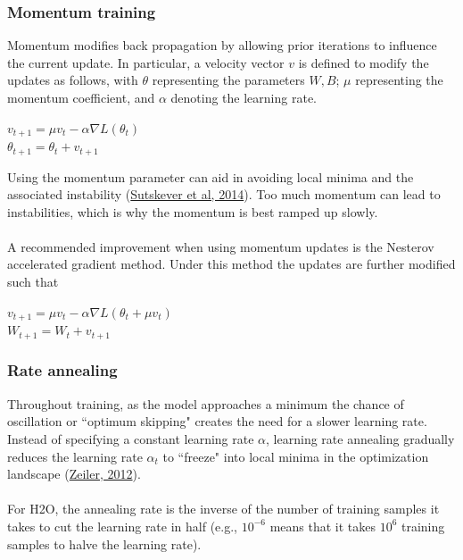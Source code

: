 \documentclass[11pt]{article}
\begin{document}
\subsubsection{Momentum training} \label{2.4.1}
Momentum modifies back propagation by allowing prior iterations to influence the current update. In particular, a velocity vector $v$ is defined to modify the updates as follows, with $\theta$ representing the parameters $W,B$; $\mu$ representing the momentum coefficient, and $\alpha$ denoting 
the learning rate. 
\begin{center}
$v_{t+1} = \mu v_t - \alpha \nabla L(\theta_t)$
\\
$\theta_{t+1} = \theta_t + v_{t+1}$
\end{center}
Using the momentum parameter can aid in avoiding 
local minima and the associated instability (\href{http://www.cs.toronto.edu/~fritz/absps/momentum.pdf}{Sutskever et al, 2014}). Too much momentum can lead to instabilities, which is why the momentum is best ramped up slowly.
\\
\\
A recommended improvement when using momentum updates is the Nesterov accelerated gradient method. Under this method the updates are further modified such that 
\begin{center}
$v_{t+1} = \mu v_t - \alpha \nabla L(\theta_t + \mu v_t)$
\\
$W_{t+1} = W_t + v_{t+1}$
\end{center}
\subsubsection{Rate annealing} \label{2.4.2}

Throughout training, as the model approaches a minimum the chance of oscillation or ``optimum skipping" creates the need for a slower learning rate. Instead of specifying a constant learning rate $\alpha$, learning rate annealing gradually reduces the learning rate $\alpha_t$ to ``freeze" into local minima in the optimization landscape (\href{http://arxiv.org/pdf/1212.5701v1.pdf}{Zeiler, 2012}).  
\\
\\
For H2O, the annealing rate is the inverse of the number of training samples it takes to cut the learning rate in half (e.g., $10^{-6}$ means that it takes $10^6$ training samples to halve the learning rate).
\end{document}

